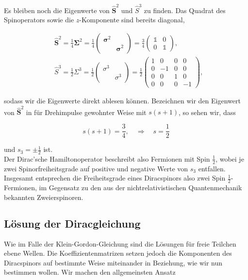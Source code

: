 \documentclass[10pt, letterpaper]{article}
\begin{document}
Es bleiben noch die Eigenwerte von $\hat{\mathbf{S}}^{2}$ und $\hat{S}^{3}$ zu finden. Das Quadrat des Spinoperators sowie die $z$-Komponente sind bereits diagonal,

$$
\begin{aligned}
& \hat{\mathbf{S}}^{2}=\frac{1}{4} \boldsymbol{\Sigma}^{2}=\frac{1}{4}\left(\begin{array}{ll}
\boldsymbol{\sigma}^{2} & \\
& \boldsymbol{\sigma}^{2}
\end{array}\right)=\frac{3}{4}\left(\begin{array}{ll}
\mathbb{1} & 0 \\
0 & \mathbb{1}
\end{array}\right), \\
& \hat{S}^{3}=\frac{1}{2} \Sigma^{3}=\frac{1}{2}\left(\begin{array}{ll}
\sigma^{3} & \\
& \sigma^{3}
\end{array}\right)=\frac{1}{2}\left(\begin{array}{cccc}
1 & 0 & 0 & 0 \\
0 & -1 & 0 & 0 \\
0 & 0 & 1 & 0 \\
0 & 0 & 0 & -1
\end{array}\right),
\end{aligned}
$$

sodass wir die Eigenwerte direkt ablesen können. Bezeichnen wir den Eigenwert von $\hat{\mathbf{S}}^{2}$ in für Drehimpulse gewohnter Weise mit $s(s+1)$, so sehen wir, dass

$$
s(s+1)=\frac{3}{4}, \quad \Rightarrow \quad s=\frac{1}{2}
$$

und $s_{3}= \pm \frac{1}{2}$ ist.\\
Der Dirac'sche Hamiltonoperator beschreibt also Fermionen mit Spin $\frac{1}{2}$, wobei je zwei Spinorfreiheitsgrade auf positive und negative Werte von $s_{3}$ entfallen. Insgesamt entsprechen die Freiheitsgrade eines Diracspinors also zwei Spin $\frac{1}{2}$-Fermionen, im Gegensatz zu den aus der nichtrelativistischen Quantenmechanik bekannten Zweierspinoren.


\pagebreak

\subsection{Lösung der Diracgleichung}

Wie im Falle der Klein-Gordon-Gleichung sind die Lösungen für freie Teilchen ebene Wellen. Die Koeffizientenmatrizen setzen jedoch die Komponenten des Diracspinors auf bestimmte Weise miteinander in Beziehung, wie wir nun bestimmen wollen. Wir machen den allgemeinsten Ansatz
\end{document}
